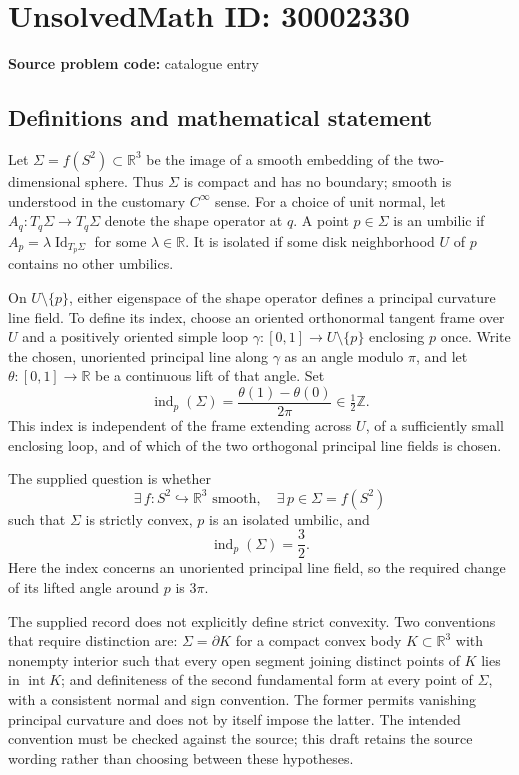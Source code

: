\documentclass[11pt]{article}
\newcommand{\Z}{\mathbb{Z}}
\newcommand{\R}{\mathbb{R}}
\begin{document}
\section*{UnsolvedMath ID: 30002330}
\textbf{Source problem code:} catalogue entry
\subsection{Definitions and mathematical statement}
Let \(\Sigma=f(S^2)\subset\R^3\) be the image of a smooth embedding of the two-dimensional sphere. Thus \(\Sigma\) is compact and has no boundary; smooth is understood in the customary \(C^\infty\) sense. For a choice of unit normal, let \(A_q:T_q\Sigma\to T_q\Sigma\) denote the shape operator at \(q\). A point \(p\in\Sigma\) is an umbilic if \(A_p=\lambda\operatorname{Id}_{T_p\Sigma}\) for some \(\lambda\in\R\). It is isolated if some disk neighborhood \(U\) of \(p\) contains no other umbilics.

On \(U\setminus\{p\}\), either eigenspace of the shape operator defines a principal curvature line field. To define its index, choose an oriented orthonormal tangent frame over \(U\) and a positively oriented simple loop \(\gamma:[0,1]\to U\setminus\{p\}\) enclosing \(p\) once. Write the chosen, unoriented principal line along \(\gamma\) as an angle modulo \(\pi\), and let \(\theta:[0,1]\to\R\) be a continuous lift of that angle. Set
\[
\operatorname{ind}_p(\Sigma)=\frac{\theta(1)-\theta(0)}{2\pi}\in\tfrac12\Z.
\]
This index is independent of the frame extending across \(U\), of a sufficiently small enclosing loop, and of which of the two orthogonal principal line fields is chosen.

The supplied question is whether
\[
\exists\,f:S^2\hookrightarrow\R^3\text{ smooth},\quad
\exists\,p\in\Sigma=f(S^2)
\]
such that \(\Sigma\) is strictly convex, \(p\) is an isolated umbilic, and
\[
\operatorname{ind}_p(\Sigma)=\frac32.
\]
Here the index concerns an unoriented principal line field, so the required change of its lifted angle around \(p\) is \(3\pi\).

The supplied record does not explicitly define strict convexity. Two conventions that require distinction are: \(\Sigma=\partial K\) for a compact convex body \(K\subset\R^3\) with nonempty interior such that every open segment joining distinct points of \(K\) lies in \(\operatorname{int}K\); and definiteness of the second fundamental form at every point of \(\Sigma\), with a consistent normal and sign convention. The former permits vanishing principal curvature and does not by itself impose the latter. The intended convention must be checked against the source; this draft retains the source wording rather than choosing between these hypotheses.
\end{document}
